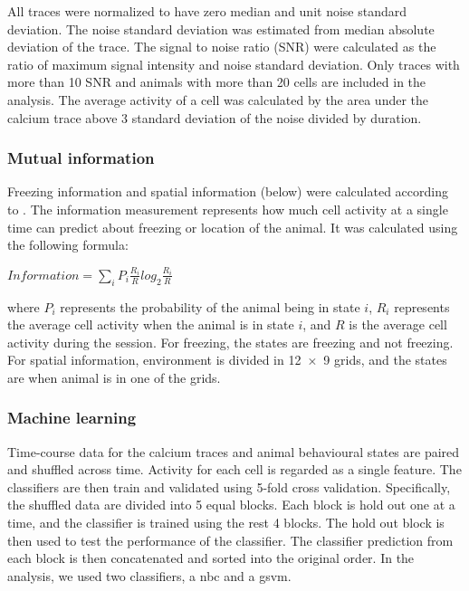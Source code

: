 All traces were normalized to have zero median and unit noise standard deviation. The noise standard deviation was estimated from median absolute deviation of the trace. The signal to noise ratio (SNR) were calculated as the ratio of maximum signal intensity and noise standard deviation. Only traces with more than 10 SNR and animals with more than 20 cells are included in the analysis. The average activity of a cell was calculated by the area under the calcium trace above 3 standard deviation of the noise divided by duration.

\subsubsection{Mutual information}

Freezing information and spatial information (below) were calculated according to \citet{skaggs93}. The information measurement represents how much cell activity at a single time can predict about freezing or location of the animal.  It was calculated using the following formula:

$Information = \displaystyle\sum_{i}^{}P_i  \frac{R_i}{R} log_2 \frac{R_i}{R}$

where $P_i$ represents the probability of the animal being in state $i$,  $R_i$ represents the average cell activity when the animal is in state $i$, and $R$ is the average cell activity during the session. For freezing, the states are freezing and not freezing. For spatial information, environment is divided in \num{12 x 9} grids, and the states are when animal is in one of the grids.

\subsubsection{Machine learning}

Time-course data for the calcium traces and animal behavioural states are paired and shuffled across time. Activity for each cell is regarded as a single feature. The classifiers are then train and validated using 5-fold cross validation. Specifically, the shuffled data are divided into 5 equal blocks. Each block is hold out one at a time, and the classifier is trained using the rest 4 blocks. The hold out block is then used to test the performance of the classifier. The classifier prediction from each block is then concatenated and sorted into the original order. In the analysis, we used two classifiers, a \gls{nbc} and a \gls{gsvm}. 

